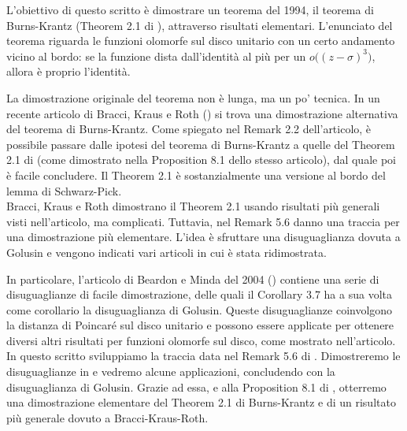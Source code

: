 L'obiettivo di questo scritto è dimostrare un teorema del 1994, il teorema di Burns-Krantz (Theorem 2.1 di \cite{BK}), attraverso risultati elementari. L'enunciato del teorema riguarda le funzioni olomorfe sul disco unitario con un certo andamento vicino al bordo: se la funzione dista dall'identità al più per un $o\bigl((z-\sigma)^3\bigr)$, allora è proprio l'identità.

La dimostrazione originale del teorema non è lunga, ma un po' tecnica. In un recente articolo di Bracci, Kraus e Roth (\cite{BKR}) si trova una dimostrazione alternativa del teorema di Burns-Krantz. Come spiegato nel Remark 2.2 dell'articolo, è possibile passare dalle ipotesi del teorema di Burns-Krantz a quelle del Theorem 2.1 di \cite{BKR} (come dimostrato nella Proposition 8.1 dello stesso articolo), dal quale poi è facile concludere. Il Theorem 2.1 è sostanzialmente una versione al bordo del lemma di Schwarz-Pick. \\

Bracci, Kraus e Roth dimostrano il Theorem 2.1 usando risultati più generali visti nell'articolo, ma complicati. Tuttavia, nel Remark 5.6 danno una traccia per una dimostrazione più elementare. L'idea è sfruttare una disuguaglianza dovuta a Golusin e vengono indicati vari articoli in cui è stata ridimostrata.

In particolare, l'articolo di Beardon e Minda del 2004 (\cite{BM}) contiene una serie di disuguaglianze di facile dimostrazione, delle quali il Corollary 3.7 ha a sua volta come corollario la disuguaglianza di Golusin. Queste disuguaglianze coinvolgono la distanza di Poincaré sul disco unitario e possono essere applicate per ottenere diversi altri risultati per funzioni olomorfe sul disco, come mostrato nell'articolo. \\

In questo scritto sviluppiamo la traccia data nel Remark 5.6 di \cite{BKR}. Dimostreremo le disuguaglianze in \cite{BM} e vedremo alcune applicazioni, concludendo con la disuguaglianza di Golusin. Grazie ad essa, e alla Proposition 8.1 di \cite{BKR}, otterremo una dimostrazione elementare del Theorem 2.1 di Burns-Krantz e di un risultato più generale dovuto a Bracci-Kraus-Roth.
